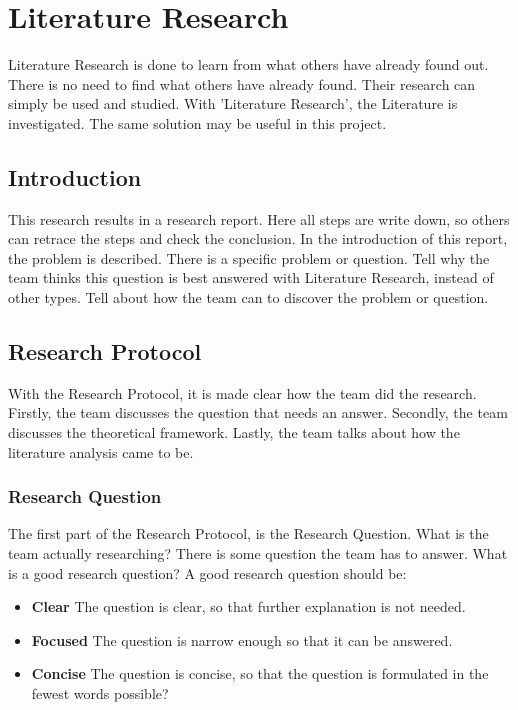 \documentclass[10pt]{report}
\begin{document}
\newpage

\section{Literature Research}

Literature Research is done to learn from what others have already found out. There is no need to find what others have already found. Their research can simply be used and studied. With 'Literature Research', the Literature is investigated. The same solution may be useful in this project.

\subsection{Introduction}

This research results in a research report. Here all steps are write down, so others can retrace the steps and check the conclusion. In the introduction of this report, the problem is described. There is a specific problem or question. Tell why the team thinks this question is best answered with Literature Research, instead of other types. Tell about how the team can to discover the problem or question.

\subsection{Research Protocol}

With the Research Protocol, it is made clear how the team did the research. Firstly, the team discusses the question that needs an answer. Secondly, the team discusses the theoretical framework. Lastly, the team talks about how the literature analysis came to be.

\subsubsection{Research Question}

The first part of the Research Protocol, is the Research Question. What is the team actually researching? There is some question the team has to answer. What is a good research question? A good research question should be:

\begin{itemize}
	\item \textbf{Clear} The question is clear, so that further explanation is not needed.
	\item \textbf{Focused} The question is narrow enough so that it can be answered.
	\item \textbf{Concise} The question is concise, so that the question is formulated in the fewest words possible?
\end{itemize}
\end{document}
